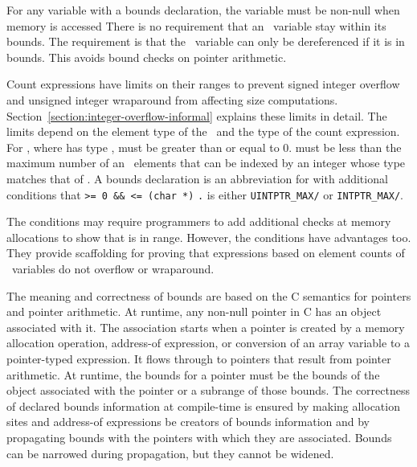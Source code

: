 For any variable with a bounds declaration, the variable must be
non-null when memory is accessed There is no requirement that an
\arrayptr\ variable stay within its bounds. The requirement is
that the \arrayptr\ variable can only be dereferenced if it is
in bounds. This avoids bound checks on pointer arithmetic.

Count expressions have limits on their ranges to prevent signed integer
overflow and unsigned integer wraparound from affecting size
computations. Section~\ref{section:integer-overflow-informal}
explains these limits in detail. The limits
depend on the element type of the \arrayptr\ and the type of the count
expression. For , where 
has type \arrayptrT ,
 must be greater than or equal to 0.  must be less
than the maximum number of an
\arrayptrT\ elements
that can be indexed by an integer whose type matches that of .
A bounds declaration  is an
abbreviation for  with additional conditions that 
\texttt{>= 0 \&\&  <= (char *)}
\texttt{.}  is either
\texttt{UINTPTR\_MAX/} or
\texttt{INTPTR\_MAX/}. 

The conditions may require programmers to add additional checks at memory allocations
to show that  is in range. However, the conditions have advantages too.
They provide scaffolding for proving that expressions based on
element counts of \arrayptr\ variables do not overflow or wraparound.

The meaning and correctness of bounds are based on the C semantics for
pointers and pointer arithmetic. At runtime, any non-null pointer in C
has an object associated with it. The association starts when a pointer
is created by a memory allocation operation, address-of expression, or
conversion of an array variable to a pointer-typed expression. It flows
through to pointers that result from pointer arithmetic. At runtime, the
bounds for a pointer must be the bounds of the object associated with
the pointer or a subrange of those bounds. The correctness of declared
bounds information at compile-time is ensured by making allocation sites
and address-of expressions be creators of bounds information and by
propagating bounds with the pointers with which they are associated.
Bounds can be narrowed during propagation, but they cannot be widened.

